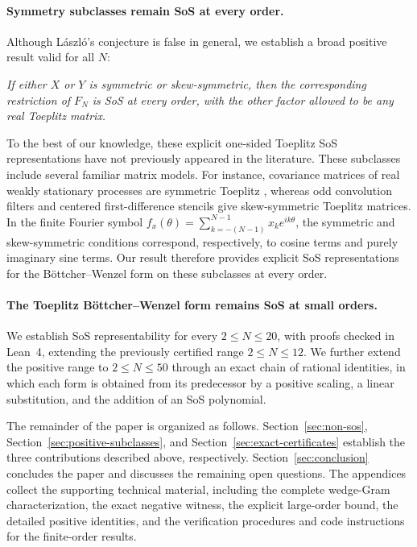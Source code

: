 \paragraph{Symmetry subclasses remain SoS at every order.}
Although L\'aszl\'o's conjecture is false in general, we establish
a broad positive result valid for all $N$:
\begin{center}
\emph{If either $X$ or $Y$ is symmetric or skew-symmetric,
then the corresponding restriction of $F_N$ is SoS at every order,
with the other factor allowed to be any real Toeplitz matrix.}
\end{center}
To the best of our knowledge, these explicit one-sided Toeplitz
SoS representations have not previously appeared in the literature. These subclasses include several familiar matrix models.
For instance, covariance matrices of real weakly stationary processes
are symmetric Toeplitz \cite{gray2006}, whereas odd convolution filters
and centered first-difference stencils give skew-symmetric Toeplitz
matrices. In the finite Fourier symbol
$f_x(\theta)=\sum_{k=-(N-1)}^{N-1}x_ke^{ik\theta}$,
the symmetric and skew-symmetric conditions correspond, respectively,
to cosine terms and purely imaginary sine terms.
Our result therefore provides explicit SoS representations for the
B\"ottcher--Wenzel form on these subclasses at every order.

\paragraph{The Toeplitz B\"ottcher--Wenzel form remains SoS at small orders.}
We establish SoS representability for every $2\le N\le20$, with
proofs checked in Lean~4, extending the previously certified range
$2\le N\le12$. We further extend the positive range to $2\le N\le50$
through an exact chain of rational identities, in which each form
is obtained from its predecessor by a positive scaling, a linear
substitution, and the addition of an SoS polynomial.

The remainder of the paper is organized as follows.
Section~\ref{sec:non-sos}, Section~\ref{sec:positive-subclasses}, and
Section~\ref{sec:exact-certificates} establish the three contributions
described above, respectively.
Section~\ref{sec:conclusion} concludes the paper and discusses the
remaining open questions.
The appendices collect the supporting technical material, including the
complete wedge-Gram characterization, the exact negative witness,
the explicit large-order bound, the detailed positive identities, and
the verification procedures and code instructions for the finite-order
results.


